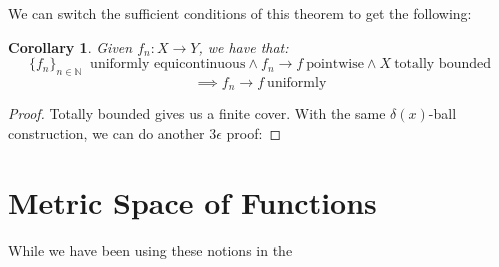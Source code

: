\documentclass[10pt,letterpaper]{article} %
\newtheorem{cor}{Corollary}[section]
\begin{document}
We can switch the sufficient conditions of this theorem to get the following:
\begin{cor}
Given $f_n: X \xrightarrow{} Y$, we have that:
\begin{equation*}
  \{f_n\}_{n \in \mathbb{N}} \ \text{ uniformly equicontinuous} \land f_n \xrightarrow{} f \ \text{pointwise} \land X \ \text{totally bounded}
\end{equation*}
\begin{equation*}
  \implies f_n \xrightarrow{} f \ \text{uniformly}
\end{equation*}
\end{cor}
\begin{proof}
Totally bounded gives us a finite cover. With the same $\delta(x)$-ball construction, we can do another $3\epsilon$ proof:
\end{proof}

\pagebreak
\section*{Metric Space of Functions}
While we have been using these notions in the 
\end{document}
